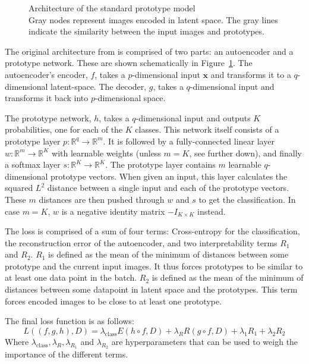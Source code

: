 \begin{figure}[h]
    \centering
    
    \caption{Architecture of the standard prototype model \\ {\normalfont Gray nodes represent images encoded in latent space. The {\color{gray} gray} lines indicate the similarity between the input images and prototypes.}}
    \label{fig:nonhierarchical}
\end{figure}
The original architecture from \citep{li2018deep} is comprised of two parts: an autoencoder and a prototype network. These are shown schematically in Figure~\ref{fig:nonhierarchical}. The autoencoder's encoder, $f$, takes a $p$-dimensional input $\textbf{x}$ and transforms it to a $q$-dimensional latent-space. The decoder, $g$, takes a $q$-dimensional input and transforms it back into $p$-dimensional space. 

The prototype network, $h$, takes a $q$-dimensional input and outputs $K$ probabilities, one for each of the $K$ classes. This network itself consists of a prototype layer $p : \mathbb{R}^q\rightarrow \mathbb{R}^m$. It is  followed by a fully-connected linear layer $w : \mathbb{R}^m\rightarrow\mathbb{R}^K$ with learnable weights (unless $m = K$, see further down), and finally a softmax layer $s : \mathbb{R}^K\rightarrow\mathbb{R}^K$. The prototype layer contains $m$ learnable $q$-dimensional prototype vectors. When given an input, this layer calculates the squared $L^2$ distance between a single input and each of the prototype vectors. These $m$ distances are then pushed through $w$ and $s$ to get the classification. In case $m = K$, $w$ is a negative identity matrix $-I_{K \times K}$ instead.

The loss is comprised of a sum of four terms: Cross-entropy for the classification, the reconstruction error of the autoencoder, and two interpretability terms $R_1$ and $R_2$. $R_1$ is defined as the mean of the minimum of distances between some prototype and the current input images. It thus forces prototypes to be similar to at least one data point in the batch. $R_2$ is defined as the mean of the minimum of distances between some datapoint in latent space and the prototypes. This term forces encoded images to be close to at least one prototype.

The final loss function is as follows:
\[ L((f,g,h),D) = \lambda_{\text{class}}E(h \circ f, D) + \lambda_R R(g \circ f,D) + \lambda_1 R_1 + \lambda_2 R_2 \]
Where $\lambda_{\text{class}}, \lambda_{R}, \lambda_{R_1}$ and $\lambda_{R_2}$ are hyperparameters that can be used to weigh the importance of the different terms. 

